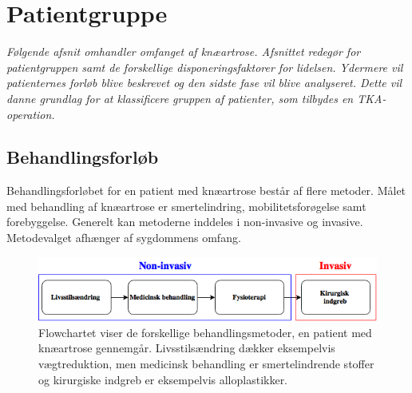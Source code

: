\section{Patientgruppe}
\textit{Følgende afsnit omhandler omfanget af knæartrose. Afsnittet redegør for patientgruppen samt de forskellige disponeringsfaktorer for lidelsen. Ydermere vil patienternes forløb blive beskrevet og den sidste fase vil blive analyseret. Dette vil danne grundlag for at klassificere gruppen af patienter, som tilbydes en TKA-operation.}

\subsection{Behandlingsforløb}
Behandlingsforløbet for en patient med knæartrose består af flere metoder. Målet med behandling af knæartrose er smertelindring, mobilitetsforøgelse samt forebyggelse. Generelt kan metoderne inddeles i non-invasive og invasive. Metodevalget afhænger af sygdommens omfang.

\begin{figure}[H]
	\centering
	\includegraphics[width=1\textwidth]{figures/bProblemanalyse/flowchart_behandlingsforloeb.png}
	\caption{Flowchartet viser de forskellige behandlingsmetoder, en patient med knæartrose gennemgår. Livsstilsændring dækker eksempelvis vægtreduktion, men medicinsk behandling er smertelindrende stoffer og kirurgiske indgreb er eksempelvis alloplastikker.}
	\label{fig:flow_behandlingsfaser}
\end{figure}\vspace{-.25cm}

